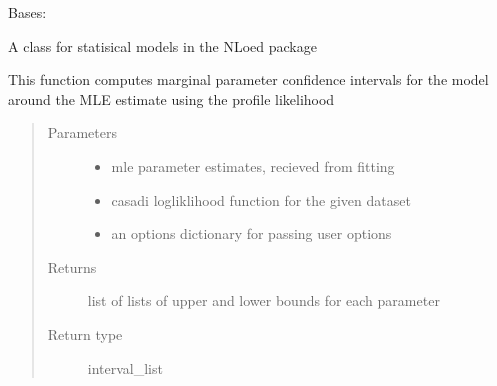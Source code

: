 \documentclass[letterpaper,10pt,english]{sphinxmanual}
\begin{document}
\begin{fulllineitems}
\label{\detokenize{nloed:nloed.model.Model}}
Bases: 

A class for statisical models in the NLoed package

\begin{fulllineitems}
\label{\detokenize{nloed:nloed.model.Model.__confidence_intervals}}
This function computes marginal parameter confidence intervals for the model
around the MLE estimate using the profile likelihood
\begin{quote}\begin{description}
\item[{Parameters}] \leavevmode\begin{itemize}
\item {} 
 \textendash{} mle parameter estimates,  recieved from fitting

\item {} 
 \textendash{} casadi logliklihood function for the given dataset

\item {} 
 \textendash{} an options dictionary for passing user options

\end{itemize}

\item[{Returns}] \leavevmode
list of lists of upper and lower bounds for each parameter

\item[{Return type}] \leavevmode
interval\_list

\end{description}\end{quote}

\end{fulllineitems}


\end{fulllineitems}
\end{document}
